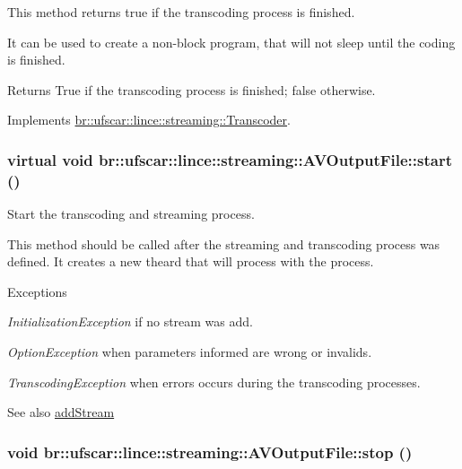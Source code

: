 This method returns true if the transcoding process is finished. 

It can be used to create a non-\/block program, that will not sleep until the coding is finished. \begin{DoxyReturn}{Returns}
True if the transcoding process is finished; false otherwise. 
\end{DoxyReturn}


Implements \hyperlink{classbr_1_1ufscar_1_1lince_1_1streaming_1_1Transcoder_a6d2588da9583e98496882efa9b472ec4}{br::ufscar::lince::streaming::Transcoder}.

\hypertarget{classbr_1_1ufscar_1_1lince_1_1streaming_1_1AVOutputFile_a9f0853e01444d14e449dfbf820d60af1}{
\subsubsection[{start}]{\setlength{\rightskip}{0pt plus 5cm}virtual void br::ufscar::lince::streaming::AVOutputFile::start ()}}
\label{classbr_1_1ufscar_1_1lince_1_1streaming_1_1AVOutputFile_a9f0853e01444d14e449dfbf820d60af1}


Start the transcoding and streaming process. 

This method should be called after the streaming and transcoding process was defined. It creates a new theard that will process with the process. 
\begin{DoxyExceptions}{Exceptions}
\item[{\em InitializationException}]if no stream was add. \item[{\em OptionException}]when parameters informed are wrong or invalids. \item[{\em TranscodingException}]when errors occurs during the transcoding processes. \end{DoxyExceptions}
\begin{DoxySeeAlso}{See also}
\hyperlink{classbr_1_1ufscar_1_1lince_1_1streaming_1_1AVOutputFile_a0357f82095145d9842bb02ecdd186152}{addStream} 
\end{DoxySeeAlso}
\hypertarget{classbr_1_1ufscar_1_1lince_1_1streaming_1_1AVOutputFile_a31a93f8972d0733a7b5dfe9cc376f66f}{
\subsubsection[{stop}]{\setlength{\rightskip}{0pt plus 5cm}void br::ufscar::lince::streaming::AVOutputFile::stop ()}}
\label{classbr_1_1ufscar_1_1lince_1_1streaming_1_1AVOutputFile_a31a93f8972d0733a7b5dfe9cc376f66f}


